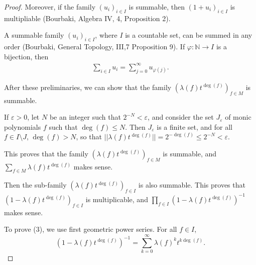\documentclass[11pt,a4paper]{article}
\newcommand{\N}{\mathbb{N}}
\begin{document}
\begin{proof}
Moreover, if the family $(u_i)_{i \in I}$ is summable, then $(1 + u_i)_{i \in I}$ is multipliable (Bourbaki, Algebra IV, 4, Proposition 2).

A summable family $(u_i)_{i \in I}$, where $I$ is a countable set, can be summed in any order (Bourbaki, General Topology, III,7 Proposition 9). If $\varphi: \N \to I$ is a bijection, then
\begin{align}
\sum_{i \in I} u_i = \sum_{j = 0}^\infty u_{\varphi(j)}.
\end{align}
\bigskip

After these preliminaries, we can show that the family $\left(\lambda(f) t^{\deg(f)} \right)_{f \in M}$ is summable.

If $\varepsilon >0$, let $N$ be an integer such that $2^{-N} < \varepsilon$, and consider the set $J_\varepsilon$ of monic polynomials $f$ such that $\deg(f) \leq N$. Then $J_\varepsilon$ is a finite set, and for all $f \in I \setminus J$, $\deg(f) >N$,  so that $ ||\lambda(f) t^{\deg(f)}|| = 2^{-\deg(f)} \leq 2^{-N} < \varepsilon$.

This proves that the family $\left(\lambda(f) t^{\deg(f)} \right)_{f \in M}$ is summable, and $\sum_{f \in M} \lambda(f) t^{\deg(f)}$ makes sense.

Then the sub-family $\left(\lambda(f) t^{\deg(f)} \right)_{f \in I}$ is also summable. This proves that $  (1 - \lambda(f) t^{\deg(f)})_{f\in I}$ is multiplicable, and $\prod\limits_{f \in I}(1 - \lambda(f) t^{\deg(f)})^{-1}$ makes sense.



To prove (3), we use first geometric power series. For all $f \in I$, 
$$(1 - \lambda(f) t^{\deg(f)})^{-1} = \sum_{k=0}^\infty \lambda(f)^k t^{k \deg(f)}.$$


\end{proof}
\end{document}
